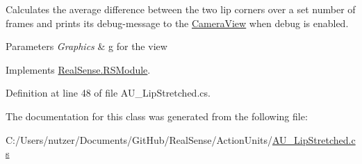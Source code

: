 Calculates the average difference between the two lip corners over a set number of frames and prints its\textquotesingle{} debug-\/message to the \hyperlink{class_real_sense_1_1_camera_view}{Camera\+View} when debug is enabled. 
\begin{DoxyParams}{Parameters}
{\em Graphics} & g for the view \\
\hline
\end{DoxyParams}


Implements \hyperlink{class_real_sense_1_1_r_s_module_a2ec830b7932ee7c0077d473f81c73867}{Real\+Sense.\+R\+S\+Module}.



Definition at line 48 of file A\+U\+\_\+\+Lip\+Stretched.\+cs.



The documentation for this class was generated from the following file\+:\begin{DoxyCompactItemize}
\item 
C\+:/\+Users/nutzer/\+Documents/\+Git\+Hub/\+Real\+Sense/\+Action\+Units/\hyperlink{_a_u___lip_stretched_8cs}{A\+U\+\_\+\+Lip\+Stretched.\+cs}\end{DoxyCompactItemize}
